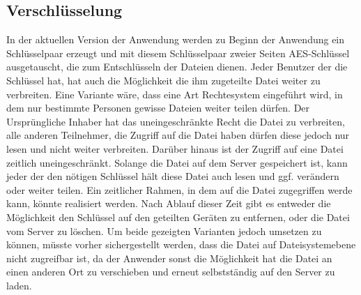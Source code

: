 \documentclass[10pt, a4paper,headsepline]{scrreprt}
\begin{document}
\subsection{Verschlüsselung}
In der aktuellen Version der Anwendung werden zu Beginn der Anwendung ein Schlüsselpaar erzeugt und mit diesem Schlüsselpaar zweier Seiten AES-Schlüssel ausgetauscht, die zum Entschlüsseln der Dateien dienen. Jeder Benutzer der die Schlüssel hat, hat auch die Möglichkeit die ihm zugeteilte Datei weiter zu verbreiten. Eine Variante wäre, dass eine Art Rechtesystem eingeführt wird, in dem nur bestimmte Personen gewisse Dateien weiter teilen dürfen. Der Ursprüngliche Inhaber hat das uneingeschränkte Recht die Datei zu verbreiten, alle anderen Teilnehmer, die Zugriff auf die Datei haben dürfen diese jedoch nur lesen und nicht weiter verbreiten. Darüber hinaus ist der Zugriff auf eine Datei zeitlich uneingeschränkt. Solange die Datei auf dem Server gespeichert ist, kann jeder der den nötigen Schlüssel hält diese Datei auch lesen und ggf. verändern oder weiter teilen. Ein zeitlicher Rahmen, in dem auf die Datei zugegriffen werde kann, könnte realisiert werden. Nach Ablauf dieser Zeit gibt es entweder die Möglichkeit den Schlüssel auf den geteilten Geräten zu entfernen, oder die Datei vom Server zu löschen. Um beide gezeigten Varianten jedoch umsetzen zu können, müsste vorher sichergestellt werden, dass die Datei auf Dateisystemebene nicht zugreifbar ist, da der Anwender sonst die Möglichkeit hat die Datei an einen anderen Ort zu verschieben und erneut selbstständig auf den Server zu laden.
\end{document}
